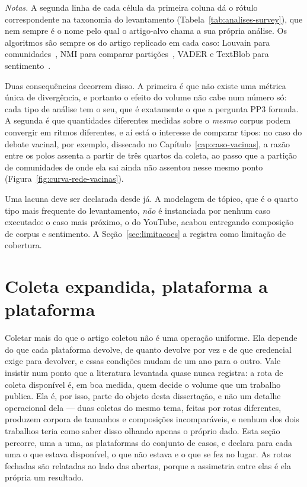 \begin{table}[htbp]
\vspace{2pt}
{\footnotesize \textit{Notas.} A segunda linha de cada célula da primeira coluna dá o
rótulo correspondente na taxonomia do levantamento (Tabela~\ref{tab:analises-survey}),
que nem sempre é o nome pelo qual o artigo-alvo chama a sua própria análise. Os
algoritmos são sempre os do artigo replicado em cada caso: Louvain para
comunidades~\cite{blondel2008louvain,traag2019leiden}, NMI para comparar
partições~\cite{danon2005nmi}, VADER e TextBlob para sentimento~\cite{hutto2014vader}.\par}
\end{table}

Duas consequências decorrem disso. A primeira é que não existe uma métrica única de
divergência, e portanto o efeito do volume não cabe num número só: cada tipo de
análise tem o seu, que é exatamente o que a pergunta PP3 formula. A segunda é que
quantidades diferentes medidas sobre o \emph{mesmo} corpus podem convergir em
ritmos diferentes, e aí está o interesse de comparar tipos: no caso do debate
vacinal, por exemplo, dissecado no Capítulo~\ref{cap:caso-vacinas}, a razão entre os polos
assenta a partir de três quartos da coleta, ao passo que a partição de comunidades
de onde ela sai ainda não assentou nesse mesmo ponto
(Figura~\ref{fig:curva-rede-vacinas}).

Uma lacuna deve ser declarada desde já. A modelagem de tópico, que é o quarto tipo
mais frequente do levantamento, \emph{não} é instanciada por nenhum caso executado:
o caso mais próximo, o do YouTube, acabou entregando composição de corpus e
sentimento. A Seção~\ref{sec:limitacoes} a registra como limitação de cobertura.

\section{Coleta expandida, plataforma a plataforma}
\label{sec:coleta-plataforma}

Coletar mais do que o artigo coletou não é uma operação uniforme. Ela depende do
que cada plataforma devolve, de quanto devolve por vez e de que credencial exige
para devolver, e essas condições mudam de um ano para o outro. Vale insistir num
ponto que a literatura levantada quase nunca registra: a rota de coleta disponível
é, em boa medida, quem decide o volume que um trabalho publica. Ela é, por isso,
parte do objeto desta dissertação, e não um detalhe operacional dela — duas
coletas do mesmo tema, feitas por rotas diferentes, produzem corpora de tamanhos e
composições incomparáveis, e nenhum dos dois trabalhos teria como saber disso
olhando apenas o próprio dado. Esta seção percorre, uma a uma, as plataformas do
conjunto de casos, e declara para cada uma o que estava disponível, o que não
estava e o que se fez no lugar. As rotas fechadas são relatadas ao lado das
abertas, porque a assimetria entre elas é ela própria um resultado.

